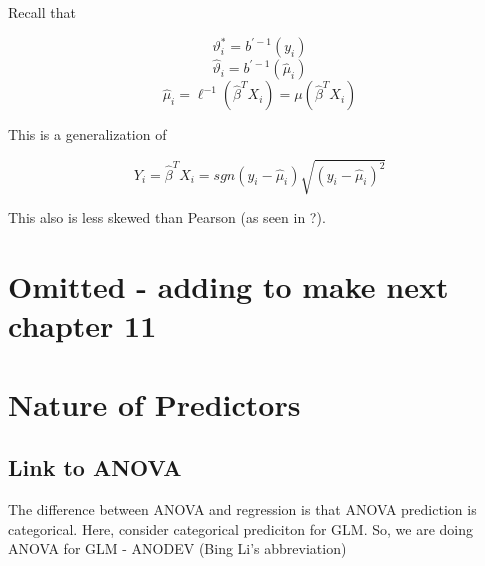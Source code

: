 \documentclass[11pt,fleqn]{book} %
\begin{document}
Recall that

		$$\vartheta^*_i = b^{'-1} (y_i) $$
		$$\hat{\vartheta}_i = b^{'-1} (\hat{\mu}_i) $$
		$$\hat{\mu}_i = \ell^{-1}(\hat{\beta}^T X_i) = \mu(\hat{\beta}^T X_i)$$

This is a generalization of 

		$$Y_i = \hat{\beta}^T X_i = sgn(y_i - \hat{\mu}_i)\sqrt{(y_i - \hat{\mu}_i)^2} $$

This also is less skewed than Pearson (as seen in  ?).




\chapter{Omitted - adding to make next chapter 11}




\chapter{Nature of Predictors}

\section{Link to ANOVA}

The difference between ANOVA and regression is that ANOVA prediction is categorical. Here, consider categorical prediciton for GLM. So, we are doing ANOVA for GLM - ANODEV (Bing Li's abbreviation) 
\end{document}
